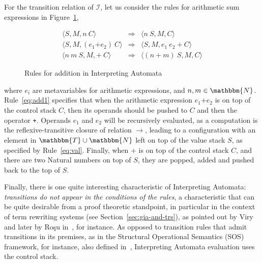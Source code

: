 \documentclass{llncs}%
\begin{document}
For the transition relation of $\mathcal{I}$, let us consider the rules for
arithmetic sum expressions in Figure~\ref{eqn:sum-sem},
\begin{figure}
\begin{eqnarray}
\label{eq:val}\langle S, M, n~ C \rangle & \Rightarrow & \langle n ~ S, M, C \rangle \\
\label{eq:add1}\langle S, M, (e_1 \mathtt{+} e_2) ~ C \rangle & \Rightarrow &
\label{eq:add2} \langle S, M, e_1 ~ e_2 ~ \mathtt{+}~ C \rangle \\
\langle n ~ m ~ S, M, \mathtt{+}~ C \rangle & \Rightarrow & \langle (n + m)~ S, M, C \rangle
\end{eqnarray}
\caption{Rules for addition in Interpreting Automata}\label{eqn:sum-sem}
\end{figure}
where \(e_i\) are metavariables for arithmetic expressions, and \(n, m
\in \mathbbm{N}\).  Rule~\ref{eq:add1} specifies that when the
arithmetic expression \(e_1 \mathtt{+} e_2\) is on top of the control
stack \(C\), then its operands should be pushed to \(C\) and then the
operator \texttt{+}. Operands \(e_1\) and \(e_2\) will be recursively
evaluated, as a computation is the reflexive-transitive closure of
relation \(\rightarrow\), leading to a configuration with an element in $\mathbbm{T} \cup \mathbbm{N}$ left on
top of the value stack $S$, as specified by
Rule~\ref{eq:val}. Finally, when $\mathtt{+}$ is on top of the control
stack $C$, and there are two Natural numbers on top of $S$, they are
popped, added and pushed back to the top of $S$.

Finally, there is one quite interesting characteristic of Interpreting
Automata:
\emph{transitions do not appear in the conditions of the rules}, a
characteristic that can be quite desirable from a proof theoretic
standpoint, in particular in the context of term rewriting systems (see Section~\ref{sec:gia-and-trs}), as
pointed out by Viry~\cite{zbMATH01440294} and later by Ro\c{s}u in~\cite{10.1007/978-3-540-31959-7_13}, for
instance. As opposed to transition rules that admit transitions in its premises, as in the Structural Operational Semantics (SOS) framework, for instance, also defined in~\cite{plotkin}, Interpreting Automata evaluation uses the
control stack.
\end{document}
